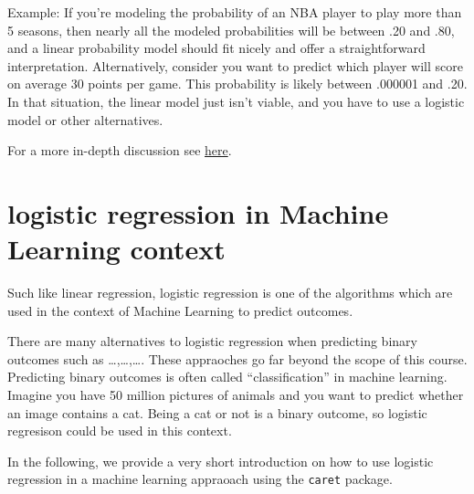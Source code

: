 \documentclass[
]{book}
\begin{document}
Example: If you're modeling the probability of an NBA player to play more than 5 seasons, then nearly all the modeled probabilities will be between .20 and .80, and a linear probability model should fit nicely and offer a straightforward interpretation. Alternatively, consider you want to predict which player will score on average 30 points per game. This probability is likely
between .000001 and .20. In that situation, the linear model just isn't viable, and you have to use a logistic model or other alternatives.

For a more in-depth discussion see \href{https://statisticalhorizons.com/linear-vs-logistic/}{here}.

\hypertarget{logistic-regression-in-machine-learning-context}{%
\section{logistic regression in Machine Learning context}\label{logistic-regression-in-machine-learning-context}}

Such like linear regression, logistic regression is one of the algorithms which
are used in the context of Machine Learning to predict outcomes.

There are many alternatives to logistic regression when predicting binary outcomes such as \ldots,\ldots,\ldots. These appraoches go far beyond the scope of this course. Predicting binary outcomes is often called ``classification'' in machine learning.
Imagine you have 50 million pictures of animals and you want to predict whether
an image contains a cat. Being a cat or not is a binary outcome, so logistic regresison could be used in this context.

In the following, we provide a very short introduction on how to use logistic regression in a machine learning appraoach using the \texttt{caret} package.
\end{document}
